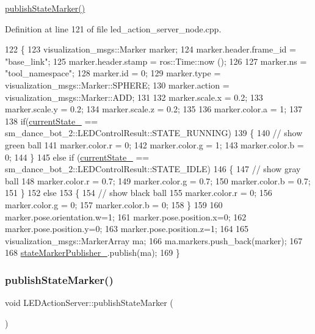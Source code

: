 \hyperlink{classLEDActionServer_a73bb754ac2347c50660624ad92315895}{publish\+State\+Marker()} 

Definition at line 121 of file led\+\_\+action\+\_\+server\+\_\+node.\+cpp.


\begin{DoxyCode}
122 \{
123     visualization\_msgs::Marker marker;
124     marker.header.frame\_id = \textcolor{stringliteral}{"base\_link"};
125     marker.header.stamp = ros::Time::now ();
126 
127     marker.ns = \textcolor{stringliteral}{"tool\_namespace"};
128     marker.id = 0;
129     marker.type = visualization\_msgs::Marker::SPHERE;
130     marker.action = visualization\_msgs::Marker::ADD;
131     
132     marker.scale.x = 0.2;
133     marker.scale.y = 0.2;
134     marker.scale.z = 0.2;
135 
136     marker.color.a = 1;
137 
138     \textcolor{keywordflow}{if}(\hyperlink{classLEDActionServer_a1dc456e987dc331501ad6ff2215661ff}{currentState\_} == sm\_dance\_bot\_2::LEDControlResult::STATE\_RUNNING)
139     \{
140       \textcolor{comment}{// show green ball}
141       marker.color.r = 0;
142       marker.color.g = 1;
143       marker.color.b = 0;
144     \}
145     \textcolor{keywordflow}{else} \textcolor{keywordflow}{if} (\hyperlink{classLEDActionServer_a1dc456e987dc331501ad6ff2215661ff}{currentState\_} == sm\_dance\_bot\_2::LEDControlResult::STATE\_IDLE)
146     \{
147       \textcolor{comment}{// show gray ball}
148       marker.color.r = 0.7;
149       marker.color.g = 0.7;
150       marker.color.b = 0.7;
151     \}
152     \textcolor{keywordflow}{else}
153     \{
154       \textcolor{comment}{// show black ball}
155       marker.color.r = 0;
156       marker.color.g = 0;
157       marker.color.b = 0;
158     \}
159 
160     marker.pose.orientation.w=1;
161     marker.pose.position.x=0;
162     marker.pose.position.y=0;
163     marker.pose.position.z=1;
164 
165     visualization\_msgs::MarkerArray ma;
166     ma.markers.push\_back(marker);
167 
168     \hyperlink{classLEDActionServer_a4168a1e4a17eb1d65aaa059ce0c52086}{stateMarkerPublisher\_}.publish(ma);
169 \}
\end{DoxyCode}
\mbox{\label{classLEDActionServer_a73bb754ac2347c50660624ad92315895}} 
\subsubsection{\texorpdfstring{publish\+State\+Marker()}{publishStateMarker()}\hspace{0.1cm}{\footnotesize\ttfamily [2/3]}}
{\footnotesize\ttfamily void L\+E\+D\+Action\+Server\+::publish\+State\+Marker (\begin{DoxyParamCaption}{ }\end{DoxyParamCaption})\hspace{0.3cm}{\ttfamily [inline]}}

